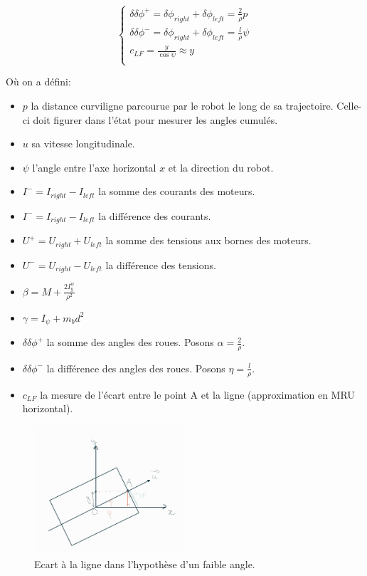 \documentclass{report}
\begin{document}
\begin{equation*}
    \begin{cases}
        \delta \delta \phi^{+} = \delta \phi_{right} + \delta \phi_{left} = \frac{2}{\rho}p \\
        \delta \delta \phi^{-} = \delta \phi_{right} + \delta \phi_{left} = \frac{l}{\rho}\psi \\
        c_{LF} = \frac{y}{\cos\psi} \approx y \\
    \end{cases}
\end{equation*}

Où on a défini:

\begin{itemize}
    \item $p$ la distance curviligne parcourue par le robot le long de sa trajectoire.
    Celle-ci doit figurer dans l'état pour mesurer les angles cumulés.
    \item $u$ sa vitesse longitudinale.
    \item $\psi$ l'angle entre l'axe horizontal $x$ et la direction du robot.
    \item $I^{-} = I_{right} - I_{left}$ la somme des courants des moteurs.
    \item $I^{-} = I_{right} - I_{left}$ la différence des courants.
    \item $U^{+} = U_{right} + U_{left}$ la somme des tensions aux bornes des moteurs.
    \item $U^{-} = U_{right} - U_{left}$ la différence des tensions.
    \item $\beta = M + \frac{2I^{w}_{y}}{\rho^2}$
    \item $\gamma = I_{\psi} + m_bd^2$
    \item $\delta \delta \phi^{+}$ la somme des angles des roues. Posons $\alpha = \frac{2}{\rho}$.
    \item $\delta \delta \phi^{-}$ la différence des angles des roues. Posons  $\eta = \frac{l}{\rho}$.
    \item $c_{LF}$ la mesure de l'écart entre le point A et la ligne (approximation en MRU horizontal).
\end{itemize}


\begin{figure}[h]  %
    \centering
    \includegraphics[width=0.5\textwidth]{figures/cLF_schema.jpg}
    \caption{Ecart à la ligne dans l'hypothèse d'un faible angle.}
\end{figure}
\end{document}
